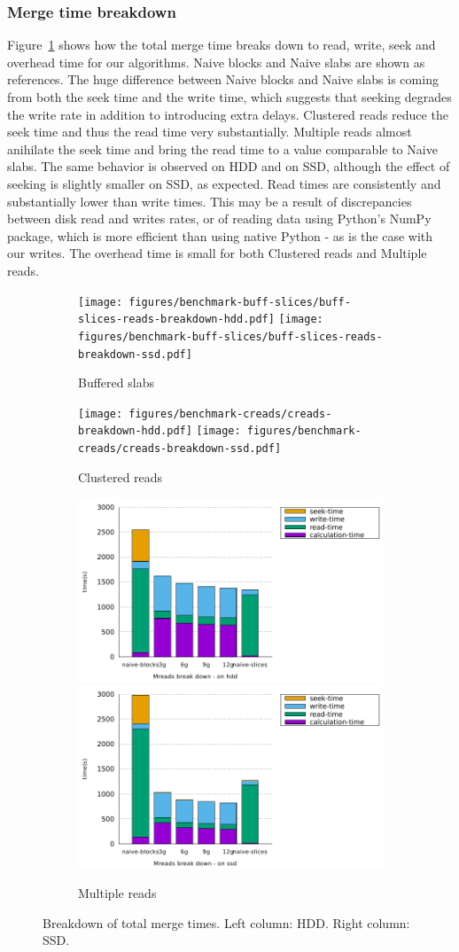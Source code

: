 \documentclass[10pt, conference, compsocconf]{IEEEtran}
\begin{document}
\subsubsection{Merge time breakdown}
Figure~\ref{fig:breakdowns-ssd} shows how the total merge time breaks
down to read, write, seek and overhead time for our algorithms. Naive
blocks and Naive slabs are shown as references. The huge difference
between Naive blocks and Naive slabs is coming from both the seek
time and the write time, which suggests that seeking degrades the
write rate in addition to introducing extra delays.
Clustered reads reduce the seek time and thus the read time very
substantially. Multiple reads almost anihilate the seek time and bring
the read time to a value comparable to Naive slabs.  The same
behavior is observed on HDD and on SSD, although the effect of seeking
is slightly smaller on SSD, as expected. Read times are consistently
and substantially lower than write times. This may be a result of
discrepancies between disk read and writes rates, or of reading data using Python's NumPy
package, which is more efficient than using native Python - as is the
case with our writes. The overhead time is small for both Clustered
reads and Multiple reads.
\begin{figure}
  \begin{subfigure}[b]{\columnwidth}
    \texttt{[image: figures/benchmark-buff-slices/buff-slices-reads-breakdown-hdd.pdf]}
    \texttt{[image: figures/benchmark-buff-slices/buff-slices-reads-breakdown-ssd.pdf]}
    \caption{Buffered slabs}
  \end{subfigure}
  \begin{subfigure}[b]{\columnwidth}
    \texttt{[image: figures/benchmark-creads/creads-breakdown-hdd.pdf]}
    \texttt{[image: figures/benchmark-creads/creads-breakdown-ssd.pdf]}
    \caption{Clustered reads}
  \end{subfigure}
  \begin{subfigure}[b]{\columnwidth}
    \includegraphics[width=0.45\columnwidth]{figures/benchmark-mreads/mreads-breakdown-hdd.pdf}
    \includegraphics[width=0.45\columnwidth]{figures/benchmark-mreads/mreads-breakdown-ssd.pdf}
    \caption{Multiple reads}
  \end{subfigure}
  \caption{Breakdown of total merge times. Left column: HDD. Right column: SSD.}
  \label{fig:breakdowns-ssd}
\end{figure}
\end{document}
